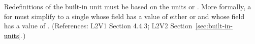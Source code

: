 Redefinitions of the built-in unit  must be based on the
units  or .  More formally, a \UnitDefinition for
 must simplify to a single \Unit whose  field
has a value of either  or  and whose
 field has a value of .  (References: L2V1 Section
4.4.3; L2V2 Section~\ref{sec:built-in-units}.)
